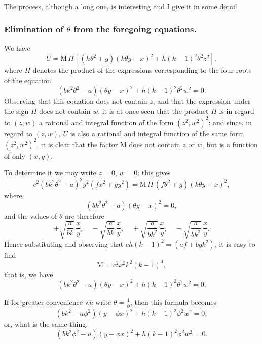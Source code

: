 \documentclass[12pt,a4paper]{article}
\theoremstyle{plain}
\begin{document}
The process, although a long one, is interesting and I give it in some detail.

\subsubsection*{Elimination of $\theta$ from the foregoing equations.}

We have
\[
U = \text{M}\,\Pi\,[(h\theta^{2} + g)(k\theta y - x)^{2} + h(k-1)^{2}\theta^{2}z^{2}],
\]
where $\Pi$ denotes the product of the expressions corresponding to the four roots of the equation
\[
(bk^{2}\theta^{2} - a)(\theta y - x)^{2} + h(k-1)^{2}\theta^{2}w^{2} = 0.
\]
Observing that this equation does not contain $z$, and that the expression under the sign $\Pi$ does not contain $w$, it is at once seen that the product $\Pi$ is in regard to $(z, w)$ a rational and integral function of the form $(z^{2}, w^{2})^{2}$; and since, in regard to $(z, w)$, $U$ is also a rational and integral function of the same form $(z^{2}, w^{2})^{2}$, it is clear that the factor M does not contain $z$ or $w$, but is a function of only $(x, y)$.

To determine it we may write $z=0$, $w=0$: this gives
\[
c^{2}(bk^{2}\theta^{2} - a)^{2}y^{2}(fx^{2} + gy^{2}) = \text{M}\,\Pi\,(f\theta^{2} + g)(k\theta y - x)^{2},
\]
where
\[
(bk^{2}\theta^{2} - a)(\theta y - x)^{2} = 0,
\]
and the values of $\theta$ are therefore
\[
+\sqrt{\frac{a}{bk}}\,\frac{x}{y}, \quad -\sqrt{\frac{a}{bk}}\,\frac{x}{y}, \quad +\sqrt{\frac{a}{bk^{2}}}\,\frac{x}{y}, \quad -\sqrt{\frac{a}{bk^{2}}}\,\frac{x}{y}.
\]
Hence substituting and observing that $ch(k-1)^{2} = (af + bgk^{2})$, it is easy to find
\[
\text{M} = c^{2}x^{2}k^{2}(k-1)^{4},
\]
that is, we have
\[
(bk^{2}\theta^{2} - a)(\theta y - x)^{2} + h(k-1)^{2}\theta^{2}w^{2} = 0.
\]

\newpage
\setcounter{page}{106}

If for greater convenience we write $\theta = \tfrac{1}{\phi}$, then this formula becomes
\[
(bk^{2} - a\phi^{2})(y - \phi x)^{2} + h(k-1)^{2}\phi^{2}w^{2} = 0,
\]
or, what is the same thing,
\[
(bk^{2}\phi^{2} - a)(y - \phi x)^{2} + h(k-1)^{2}\phi^{2}w^{2} = 0.
\]
\end{document}
